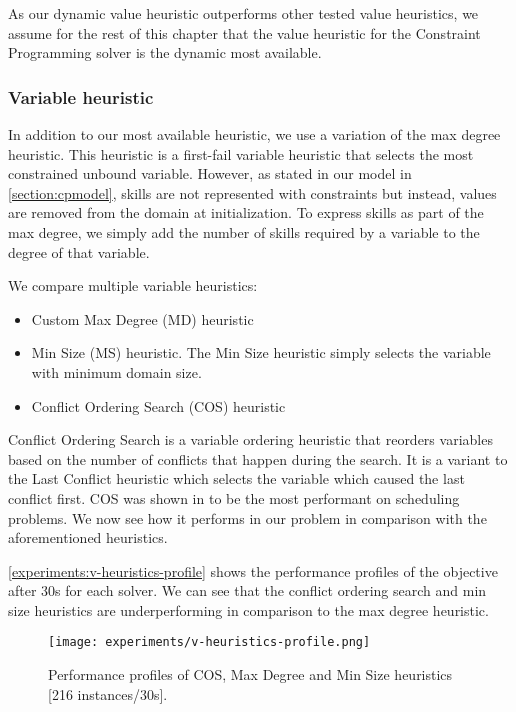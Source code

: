 \documentclass[../../thesis.tex]{subfiles}
\begin{document}
As our dynamic value heuristic outperforms other tested value heuristics, we assume for the rest of this chapter 
that the value heuristic for the Constraint Programming solver is the dynamic most available.



\subsubsection{Variable heuristic}

In addition to our most available heuristic, we use a variation of the max degree heuristic. 
This heuristic is a first-fail variable heuristic that selects the most constrained unbound variable. However,
as stated in our model in \autoref{section:cpmodel}, skills are not represented with constraints but instead, values 
are removed from the domain at initialization. To express skills as part of the max degree, we simply add the number of 
skills required by a variable to the degree of that variable.


We compare multiple variable heuristics:

\begin{itemize}
  \item Custom Max Degree (MD) heuristic
  \item Min Size (MS) heuristic. The Min Size heuristic simply selects the variable with minimum domain size.
  \item Conflict Ordering Search (COS) heuristic \cite{Gay:COS}
\end{itemize}


Conflict Ordering Search is a variable ordering heuristic that 
reorders variables based on the number of conflicts that happen during the search.
It is a variant to the Last Conflict heuristic which selects the variable which caused the last conflict first.
COS was shown in \cite{Gay:COS} to be the most performant on scheduling problems. 
We now see how it performs in our problem in comparison with the aforementioned heuristics.

\autoref{experiments:v-heuristics-profile} shows the performance profiles of the objective after 30s for each solver.
We can see that the conflict ordering search and min size heuristics are underperforming in comparison to the max degree heuristic.


\begin{figure}
  \centering
  \texttt{[image: experiments/v-heuristics-profile.png]}
  \caption{Performance profiles of COS, Max Degree and Min Size heuristics [216 instances/30s].}
  \label{experiments:v-heuristics-profile}
\end{figure}
\end{document}
